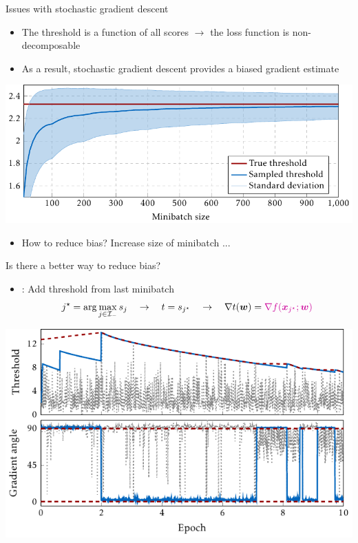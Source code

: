\documentclass[10pt, aspectratio=169]{beamer}
\begin{document}
\begin{frame}{Issues with stochastic gradient descent}
  \begin{itemize}
    \item The threshold is a function of all scores $\rightarrow$ the loss function is non-decomposable
    \item As a result, stochastic gradient descent provides a biased gradient estimate
  \end{itemize}
  \begin{center}
    \includegraphics[width=\linewidth, height=0.6\textheight, keepaspectratio]{
      ../images/deep_threshold_bias.pdf
    }
  \end{center}
  \begin{itemize}
    \item How to reduce bias? Increase size of minibatch ...
  \end{itemize}
\end{frame}

\begin{frame}{Is there a better way to reduce bias?}
  \begin{itemize}
    \item \DeepTopPush: Add threshold from last minibatch
    \begin{equation*}
      j^{\star} = \arg \max_{j \in \Ineg} s_j \quad \rightarrow \quad 
      t = s_{j^{\star}}\quad \rightarrow \quad 
      \nabla t(\bm{w}) = {\color{mypurple}\nabla f(\bm{x}_{j^{\star}}; \bm{w})}
    \end{equation*}
  \end{itemize}
  \begin{center}
    \includegraphics[width=\linewidth, height=0.75\textheight, keepaspectratio]{
      ../images/deep_thresholds.pdf
    }
  \end{center}
\end{frame}
\end{document}
